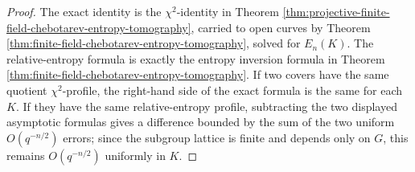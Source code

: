 \begin{proof}
The exact identity is the \(\chi^2\)-identity in Theorem \ref{thm:projective-finite-field-chebotarev-entropy-tomography}, carried to open curves by Theorem \ref{thm:finite-field-chebotarev-entropy-tomography}, solved for \(E_n(K)\). The relative-entropy formula is exactly the entropy inversion formula in Theorem \ref{thm:finite-field-chebotarev-entropy-tomography}. If two covers have the same quotient \(\chi^2\)-profile, the right-hand side of the exact formula is the same for each \(K\). If they have the same relative-entropy profile, subtracting the two displayed asymptotic formulas gives a difference bounded by the sum of the two uniform \(O(q^{-n/2})\) errors; since the subgroup lattice is finite and depends only on \(G\), this remains \(O(q^{-n/2})\) uniformly in \(K\).
\end{proof}

